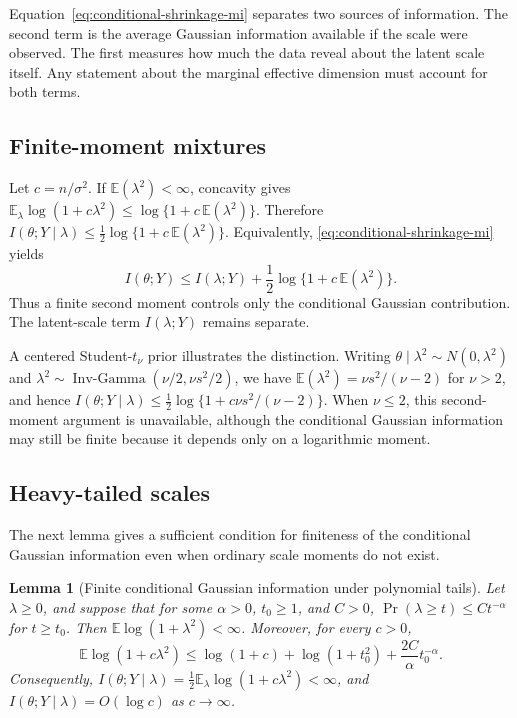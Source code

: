 \documentclass[11pt]{article}
\theoremstyle{plain}
\newtheorem{lemma}{Lemma}
\theoremstyle{definition}
\theoremstyle{remark}
\newcommand{\E}{\mathbb{E}}
\begin{document}
Equation~\eqref{eq:conditional-shrinkage-mi} separates two sources of information. The second term is the average Gaussian information available if the scale were observed. The first measures how much the data reveal about the latent scale itself. Any statement about the marginal effective dimension must account for both terms.

\subsection{Finite-moment mixtures}

Let \(c=n/\sigma^2\). If \(\E(\lambda^2)<\infty\), concavity gives \(\E_\lambda\log(1+c\lambda^2)\leq\log\{1+c\,\E(\lambda^2)\}\). Therefore \(I(\theta;Y\mid\lambda)\leq\frac12\log\{1+c\,\E(\lambda^2)\}\). Equivalently, \eqref{eq:conditional-shrinkage-mi} yields
\[
I(\theta;Y)
\leq
I(\lambda;Y)
+
\frac12\log\{1+c\,\E(\lambda^2)\}.
\]
Thus a finite second moment controls only the conditional Gaussian contribution. The latent-scale term \(I(\lambda;Y)\) remains separate.

A centered Student-\(t_\nu\) prior illustrates the distinction. Writing \(\theta\mid\lambda^2\sim N(0,\lambda^2)\) and \(\lambda^2\sim\operatorname{Inv\text{-}Gamma}(\nu/2,\nu s^2/2)\), we have \(\E(\lambda^2)=\nu s^2/(\nu-2)\) for \(\nu>2\), and hence \(I(\theta;Y\mid\lambda)\leq\frac12\log\{1+c\nu s^2/(\nu-2)\}\). When \(\nu\leq2\), this second-moment argument is unavailable, although the conditional Gaussian information may still be finite because it depends only on a logarithmic moment.

\subsection{Heavy-tailed scales}
\label{subsec:heavy-tailed-scales}

The next lemma gives a sufficient condition for finiteness of the conditional Gaussian information even when ordinary scale moments do not exist.

\begin{lemma}[Finite conditional Gaussian information under polynomial tails]
	\label{lem:heavy-tail-log-moment}
	Let \(\lambda\geq0\), and suppose that for some \(\alpha>0\), \(t_0\geq1\), and \(C>0\), \(\Pr(\lambda\geq t)\leq Ct^{-\alpha}\) for \(t\geq t_0\). Then \(\E\log(1+\lambda^2)<\infty\). Moreover, for every \(c>0\),
	\[
	\E\log(1+c\lambda^2)
	\leq
	\log(1+c)
	+
	\log(1+t_0^2)
	+
	\frac{2C}{\alpha}t_0^{-\alpha}.
	\]
	Consequently, \(I(\theta;Y\mid\lambda)=\frac12\E_\lambda\log(1+c\lambda^2)<\infty\), and \(I(\theta;Y\mid\lambda)=O(\log c)\) as \(c\to\infty\).
\end{lemma}
\end{document}

